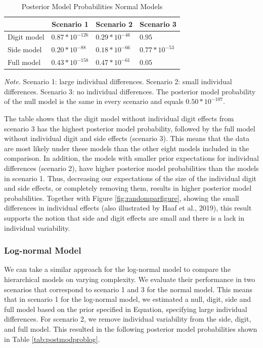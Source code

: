 \documentclass[
  english,
  doc,floatsintext]{apa6}
\begin{document}
\begin{table}[H]
\caption{Posterior Model Probabilities Normal Models}
\label{tab:postmodprob}
\begin{tabularx}{\textwidth}{XXXX}
\toprule
 & \multicolumn{1}{c}{Scenario 1} & \multicolumn{1}{c}{Scenario 2} & \multicolumn{1}{c}{Scenario 3}\\
\midrule
Digit model & $0.87*10^{-126}$ & $0.29*10^{-46}$ & $0.95$\\
Side model & $0.20*10^{-88}$ & $0.18*10^{-66}$ & $0.77*10^{-53}$ \\
Full model & $0.43*10^{-158}$ & $0.47*10^{-61}$ & $0.05$\\
\bottomrule
\end{tabularx}
\begin{tablenotes}[para]
\textit{Note.} Scenario 1: large individual differences. Scenario 2: small individual differences. Scenario 3: no individual differences. The posterior model probability of the null model is the same in every scenario and equals $0.50*10^{-107}$. 
\end{tablenotes}
\end{table}

The table shows that the digit model without individual digit effects from scenario 3 has the highest posterior model probability, followed by the full model without individual digit and side effects (scenario 3). This means that the data are most likely under these models than the other eight models included in the comparison. In addition, the models with smaller prior expectations for individual differences (scenario 2), have higher posterior model probabilities than the models in scenario 1. Thus, decreasing our expectations of the size of the individual digit and side effects, or completely removing them, results in higher posterior model probabilities. Together with Figure \ref{fig:randomparfigure}, showing the small differences in individual effects (also illustrated by Haaf et al., 2019), this result supports the notion that side and digit effects are small and there is a lack in individual variability.

\hypertarget{log-normal-model-3}{%
\subsubsection{Log-normal Model}\label{log-normal-model-3}}

We can take a similar approach for the log-normal model to compare the hierarchical models on varying complexity. We evaluate their performance in two scenarios that correspond to scenario 1 and 3 for the normal model. This means that in scenario 1 for the log-normal model, we estimated a null, digit, side and full model based on the prior specified in Equation, specifying large individual differences. For scenario 2, we remove individual variability from the side, digit, and full model. This resulted in the following posterior model probabilities shown in Table \ref{tab:postmodproblog}.
\end{document}
